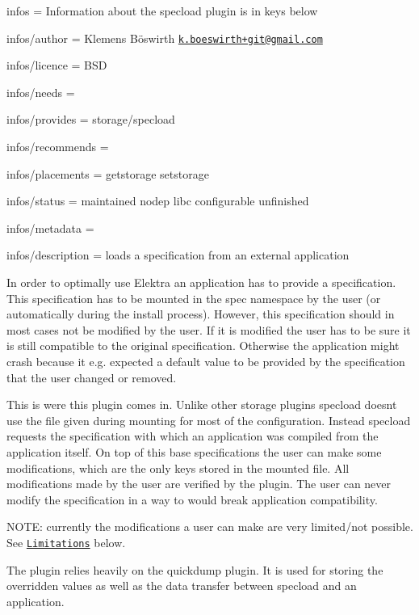 
\begin{DoxyItemize}
\item infos = Information about the specload plugin is in keys below
\item infos/author = Klemens Böswirth \href{mailto:k.boeswirth+git@gmail.com}{\tt k.\+boeswirth+git@gmail.\+com}
\item infos/licence = B\+SD
\item infos/needs =
\item infos/provides = storage/specload
\item infos/recommends =
\item infos/placements = getstorage setstorage
\item infos/status = maintained nodep libc configurable unfinished
\item infos/metadata =
\item infos/description = loads a specification from an external application
\end{DoxyItemize}

In order to optimally use Elektra an application has to provide a specification. This specification has to be mounted in the {\ttfamily spec} namespace by the user (or automatically during the install process). However, this specification should in most cases not be modified by the user. If it is modified the user has to be sure it is still compatible to the original specification. Otherwise the application might crash because it e.\+g. expected a default value to be provided by the specification that the user changed or removed.

This is were this plugin comes in. Unlike other storage plugins {\ttfamily specload} doesn\textquotesingle{}t use the file given during mounting for most of the configuration. Instead {\ttfamily specload} requests the specification with which an application was compiled from the application itself. On top of this base specifications the user can make some modifications, which are the only keys stored in the mounted file. All modifications made by the user are verified by the plugin. The user can never modify the specification in a way to would break application compatibility.

N\+O\+TE\+: currently the modifications a user can make are very limited/not possible. See \href{#limitations}{\tt Limitations} below.

The plugin relies heavily on the {\ttfamily quickdump} plugin. It is used for storing the overridden values as well as the data transfer between {\ttfamily specload} and an application.

